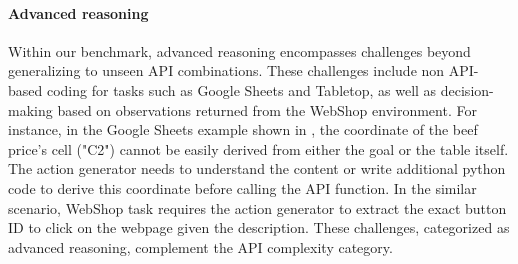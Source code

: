\paragraph{Advanced reasoning} 
Within our benchmark, advanced reasoning encompasses challenges beyond generalizing to unseen API combinations. These challenges include non API-based coding for tasks such as Google Sheets and Tabletop, as well as decision-making based on observations returned from the WebShop environment. 
For instance, in the Google Sheets example shown in , the coordinate of the beef price's cell ("C2") cannot be easily derived from either the goal or the table itself. The action generator needs to understand the content or write additional python code to derive this coordinate before calling the API function.  
In the similar scenario, WebShop task requires the action generator to extract the exact button ID to click on the webpage given the description. 
These challenges, categorized as advanced reasoning, complement the API complexity category.







